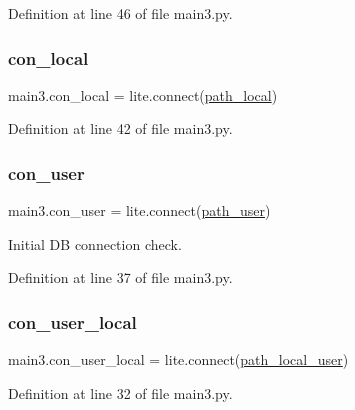Definition at line 46 of file main3.\+py.

\mbox{\label{namespacemain3_ac151e893e4ce2a34734073cf06c5f84a}} 
\subsubsection{\texorpdfstring{con\+\_\+local}{con\_local}}
{\footnotesize\ttfamily main3.\+con\+\_\+local = lite.\+connect(\hyperlink{namespacemain3_a8e2441fb4fc06f2788b1864358403339}{path\+\_\+local})}



Definition at line 42 of file main3.\+py.

\mbox{\label{namespacemain3_a53e03f12882bc3b99c9324b7814074ec}} 
\subsubsection{\texorpdfstring{con\+\_\+user}{con\_user}}
{\footnotesize\ttfamily main3.\+con\+\_\+user = lite.\+connect(\hyperlink{namespacemain3_a7e2fe5acbb746b4190127a6d04b418ed}{path\+\_\+user})}



Initial DB connection check. 



Definition at line 37 of file main3.\+py.

\mbox{\label{namespacemain3_a693b4f7c34d4957bdd692bbb2ec9775f}} 
\subsubsection{\texorpdfstring{con\+\_\+user\+\_\+local}{con\_user\_local}}
{\footnotesize\ttfamily main3.\+con\+\_\+user\+\_\+local = lite.\+connect(\hyperlink{namespacemain3_ab90723267d7b609bc02469c11db32a64}{path\+\_\+local\+\_\+user})}



Definition at line 32 of file main3.\+py.

\mbox{\label{namespacemain3_ad437a0de30e4b6dfc9d354c3d56e43ac}} 

